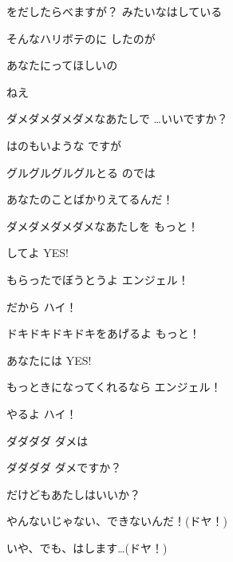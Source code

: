 \documentclass[a4paper,tate,twocolumn,12pt]{ltjtarticle}
\begin{document}
\begin{flushleft}
\begin{minipage}{\linewidth}
をだしたらべますが？ みたいなはしている

そんなハリボテのに したのが

あなたにってほしいの
\end{minipage}

\vspace{2em}

\noindent\begin{minipage}{\linewidth}
ねえ

ダメダメダメダメなあたしで …いいですか？

はのもいような ですが

グルグルグルグルとる のでは

あなたのことばかりえてるんだ！
\end{minipage}

\vspace{2em}

\noindent\begin{minipage}{\linewidth}
ダメダメダメダメなあたしを もっと！

してよ YES!

もらったでぼうとうよ エンジェル！

だから ハイ！

ドキドキドキドキをあげるよ もっと！

あなたには YES!

もっときになってくれるなら エンジェル！

やるよ ハイ！

ダダダダ ダメは

ダダダダ ダメですか？

だけどもあたしはいいか？

やんないじゃない、できないんだ！(ドヤ！)
\end{minipage}

\vspace{2em}

\noindent\begin{minipage}{\linewidth}
いや、でも、はします…(ドヤ！)
\end{minipage}

\end{flushleft}
\end{document}
